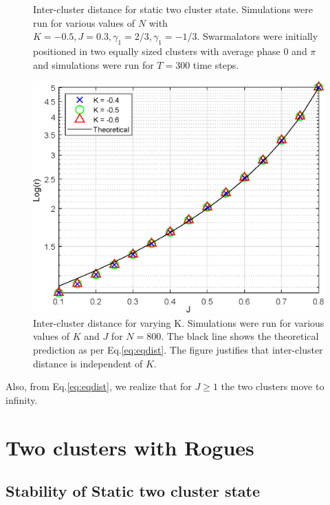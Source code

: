 \documentclass[twocolumn,10pt]{asme2ej}
\begin{document}
{{\begin{figure}[h!]
            \caption{Inter-cluster distance for static two cluster state. Simulations were run for various values of \(N\) with \(K = -0.5,J = 0.3,\gamma_1 = 2/3,\gamma_1 = -1/3\). Swarmalators were initially positioned in two equally sized clusters with average phase \(0\) and \(\pi\) and simulations were run for \(T = 300\) time steps.}
            \label{fig:dvn}
        \end{figure}
        \begin{figure}[h!]
            \includegraphics[width = \linewidth]{interClust.eps}
            \caption{Inter-cluster distance for varying K. Simulations were run for various values of \(K\) and \(J\) for \(N = 800\). The black line shows the theoretical prediction as per Eq.\ref{eq:eqdist}. The figure justifies that inter-cluster distance is independent of \(K\).}
            \label{fig:KvJ}
        \end{figure}
        Also, from Eq.\ref*{eq:eqdist}, we realize that for \(J \geq 1\) the two clusters move to infinity. 
    }
    \section{Two clusters with Rogues}
    {
        
    }
    \subsection{Stability of Static two cluster state}
    {

    }
}
\end{document}
